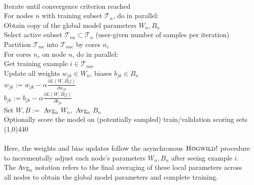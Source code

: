 \documentclass[11pt]{article}
\begin{document}
\\
Iterate until convergence criterion reached
\\
\indent For nodes $n$ with training subset $\mathcal{T}_n$, do in parallel:
\\
\indent \indent Obtain copy of the global model parameters $W_n, B_n$
\\
\indent \indent Select active subset $\mathcal{T}_{na} \subset \mathcal{T}_n$ (user-given number of samples per iteration)
\\
\indent \indent Partition $\mathcal{T}_{na}$ into $\mathcal{T}_{nac}$ by cores $n_c$
\\
\indent \indent For cores $n_c$ on node $n$, do in parallel:
\\
\indent \indent \indent Get training example $i \in \mathcal{T}_{nac}$
\\
\indent \indent \indent  Update all weights $w_{jk} \in W_n$, biases $b_{jk} \in B_n$
\\
\indent \indent \indent  \indent $w_{jk} := w_{jk} - \alpha \frac{\partial L(W,B | j)}{\partial w_{jk}}$
\\
\indent \indent \indent  \indent $b_{jk} := b_{jk} - \alpha \frac{\partial L(W,B | j)}{\partial b_{jk}}$
\\
\indent Set $W,B := $ Avg$_n$ $W_n,$ $ $Avg$_n$ $B_n$
\\
\indent Optionally score the model on (potentially sampled) train/validation scoring sets
\\
\line(1,0){440}
\\
\\
Here, the weights and bias updates follow the asynchronous  $\textsc{Hogwild!}$ procedure to incrementally adjust each node's parameters $W_n,B_n$ after seeing example $i$. The Avg$_n$ notation refers to the final averaging of these local parameters across all nodes to obtain the global model parameters and complete training.
\end{document}
